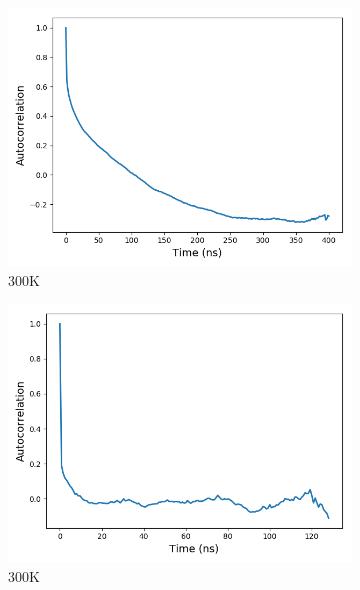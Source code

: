 \documentclass[journal=jpcbfk,manuscript=article]{achemso}
\begin{document}

  \begin{figure}[!htb]
  \centering
  \begin{subfigure}{0.45\textwidth}
  	\centering
  	\includegraphics[width=\textwidth]{dihedral_autocorrelation_300K.png}
  	\caption{300K}\label{fig:dihedrals_300K}
  \end{subfigure}
  \begin{subfigure}{0.45\textwidth}
  	\centering
  	\includegraphics[width=\textwidth]{dihedral_autocorrelation_500K.png}
  	\caption{300K}\label{fig:dihedrals_500K}
  \end{subfigure}
  \caption{}\label{fig:dihedrals}
  \end{figure}
  
\end{document}
